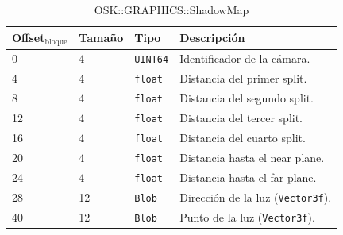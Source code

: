 \documentclass[12pt,a4paper]{article}
\begin{document}
\begin{table}[h]
\caption{OSK::GRAPHICS::ShadowMap}
\center
\begin{tabular}{llll}
\hline
Offset$_\text{bloque}$ & Tamaño & Tipo & Descripción \\ \hline
0 & 4 & \texttt{UINT64} & Identificador de la cámara. \\
4 & 4 & \texttt{float} & Distancia del primer split. \\
8 & 4 & \texttt{float} & Distancia del segundo split. \\
12 & 4 & \texttt{float} & Distancia del tercer split. \\
16 & 4 & \texttt{float} & Distancia del cuarto split. \\
20 & 4 & \texttt{float} & Distancia hasta el near plane. \\
24 & 4 & \texttt{float} & Distancia hasta el far plane. \\
28 & 12 & \texttt{Blob} & Dirección de la luz (\texttt{Vector3f}). \\
40 & 12 & \texttt{Blob} & Punto de la luz (\texttt{Vector3f}). \\
\hline
\end{tabular}
\end{table}
\end{document}
